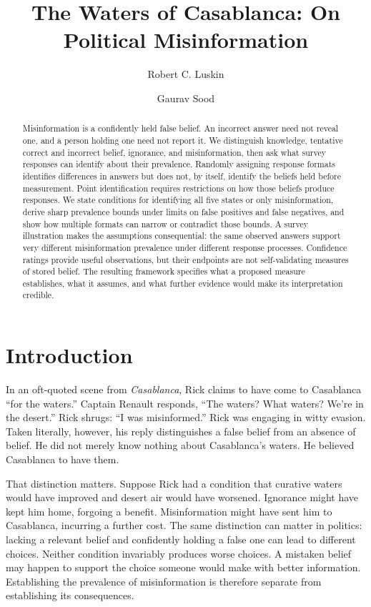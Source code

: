 \documentclass[11pt]{article}
\title{The Waters of Casablanca: On Political Misinformation}
\author{Robert C. Luskin \and Gaurav Sood}
\date{}
\begin{document}
\maketitle

\begin{abstract}
\noindent Misinformation is a confidently held false belief. An incorrect answer need not reveal one, and a person holding one need not report it. We distinguish knowledge, tentative correct and incorrect belief, ignorance, and misinformation, then ask what survey responses can identify about their prevalence. Randomly assigning response formats identifies differences in answers but does not, by itself, identify the beliefs held before measurement. Point identification requires restrictions on how those beliefs produce responses. We state conditions for identifying all five states or only misinformation, derive sharp prevalence bounds under limits on false positives and false negatives, and show how multiple formats can narrow or contradict those bounds. A survey illustration makes the assumptions consequential: the same observed answers support very different misinformation prevalence under different response processes. Confidence ratings provide useful observations, but their endpoints are not self-validating measures of stored belief. The resulting framework specifies what a proposed measure establishes, what it assumes, and what further evidence would make its interpretation credible.
\end{abstract}

\section{Introduction}

In an oft-quoted scene from \emph{Casablanca}, Rick claims to have come to Casablanca ``for the waters.'' Captain Renault responds, ``The waters? What waters? We're in the desert.'' Rick shrugs: ``I was misinformed.'' Rick was engaging in witty evasion. Taken literally, however, his reply distinguishes a false belief from an absence of belief. He did not merely know nothing about Casablanca's waters. He believed Casablanca to have them.

That distinction matters. Suppose Rick had a condition that curative waters would have improved and desert air would have worsened. Ignorance might have kept him home, forgoing a benefit. Misinformation might have sent him to Casablanca, incurring a further cost. The same distinction can matter in politics: lacking a relevant belief and confidently holding a false one can lead to different choices. Neither condition invariably produces worse choices. A mistaken belief may happen to support the choice someone would make with better information. Establishing the prevalence of misinformation is therefore separate from establishing its consequences.
\end{document}
